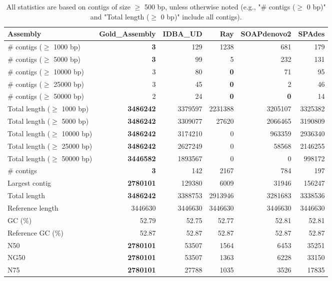 \documentclass[12pt,a4paper]{article}
\begin{document}
\begin{table}[ht]
\begin{center}
\caption{All statistics are based on contigs of size $\geq$ 500 bp, unless otherwise noted (e.g., "\# contigs ($\geq$ 0 bp)" and "Total length ($\geq$ 0 bp)" include all contigs).}
\begin{tabular}{|l*{5}{|r}|}
\hline
Assembly & Gold\_Assembly & IDBA\_UD & Ray & SOAPdenovo2 & SPAdes \\ \hline
\# contigs ($\geq$ 1000 bp) & {\bf 3} & 129 & 1238 & 681 & 179 \\ \hline
\# contigs ($\geq$ 5000 bp) & {\bf 3} & 99 & 5 & 232 & 131 \\ \hline
\# contigs ($\geq$ 10000 bp) & 3 & 80 & {\bf 0} & 71 & 95 \\ \hline
\# contigs ($\geq$ 25000 bp) & 3 & 45 & {\bf 0} & 2 & 46 \\ \hline
\# contigs ($\geq$ 50000 bp) & 2 & 24 & {\bf 0} & {\bf 0} & 14 \\ \hline
Total length ($\geq$ 1000 bp) & {\bf 3486242} & 3379597 & 2231388 & 3205107 & 3325382 \\ \hline
Total length ($\geq$ 5000 bp) & {\bf 3486242} & 3309077 & 27620 & 2066465 & 3190809 \\ \hline
Total length ($\geq$ 10000 bp) & {\bf 3486242} & 3174210 & 0 & 963359 & 2936340 \\ \hline
Total length ($\geq$ 25000 bp) & {\bf 3486242} & 2627249 & 0 & 58568 & 2146255 \\ \hline
Total length ($\geq$ 50000 bp) & {\bf 3446582} & 1893567 & 0 & 0 & 998172 \\ \hline
\# contigs & {\bf 3} & 142 & 2167 & 784 & 197 \\ \hline
Largest contig & {\bf 2780101} & 129380 & 6009 & 31946 & 156247 \\ \hline
Total length & {\bf 3486242} & 3388753 & 2913946 & 3281683 & 3338536 \\ \hline
Reference length & 3446630 & 3446630 & 3446630 & 3446630 & 3446630 \\ \hline
GC (\%) & 52.79 & 52.75 & 52.77 & 52.81 & 52.81 \\ \hline
Reference GC (\%) & 52.87 & 52.87 & 52.87 & 52.87 & 52.87 \\ \hline
N50 & {\bf 2780101} & 53507 & 1564 & 6453 & 35251 \\ \hline
NG50 & {\bf 2780101} & 53507 & 1363 & 6228 & 33150 \\ \hline
N75 & {\bf 2780101} & 27788 & 1035 & 3526 & 17835 \\ \hline

\end{tabular}
\end{center}
\end{table}
\end{document}
